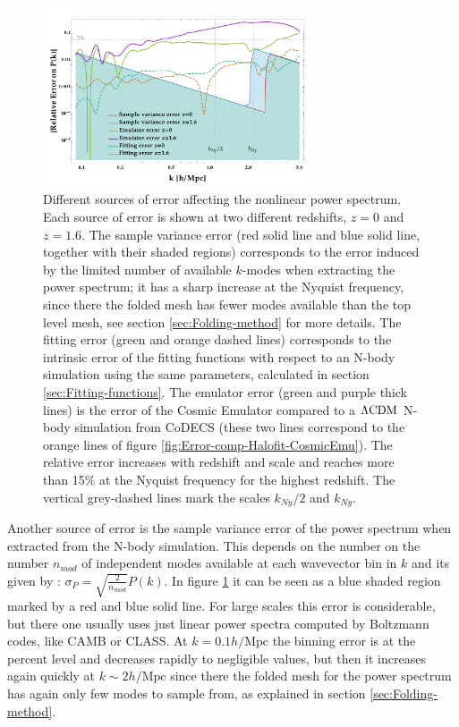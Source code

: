 \begin{figure}
\centering{}	
\includegraphics[width=0.7\textwidth]{Chapters/fitting-funcs/figures/allNbodyCosmicEmuFit-Errors-v8-Saveas}
\protect\caption[Sources of errors affecting the power spectrum from a CoDECS simulation.]{\label{fig:Error-sources}Different sources of error affecting the
nonlinear power spectrum. Each source of error is shown at two different
redshifts, $z=0$ and $z=1.6$. The sample variance error (red solid
line and blue solid line, together with their shaded regions) corresponds
to the error induced by the limited number of available $k$-modes
when extracting the power spectrum; it has a sharp increase at the
Nyquist frequency, since there the folded mesh has fewer modes available
than the top level mesh, see section \ref{sec:Folding-method} for
more details. The fitting error (green and orange dashed lines) corresponds
to the intrinsic error of the fitting functions with respect to an
N-body simulation using the same parameters, calculated in section
\ref{sec:Fitting-functions}. The emulator error (green and purple
thick lines) is the error of the Cosmic Emulator compared to a $\protect\Lambda\mathrm{CDM}$
N-body simulation from CoDECS (these two lines correspond to the orange
lines of figure \ref{fig:Error-comp-Halofit-CosmicEmu}). The relative
error increases with redshift and scale and reaches more than 15\%
at the Nyquist frequency for the highest redshift. The vertical grey-dashed
lines mark the scales $k_{Ny}/2$ and $k_{Ny}$. }
\end{figure}


Another source of error is the sample variance error of the power
spectrum when extracted from the N-body simulation. This depends on
the number on the number $n_{mod}$ of independent modes available
at each wavevector bin in $k$ and its given by \cite{feldman_power_1994}:
$\sigma_{P}=\sqrt{\frac{2}{n_{mod}}}P(k)$. In figure \ref{fig:Error-sources}
it can be seen as a blue shaded region marked by a red and blue solid
line. For large scales this error is considerable, but there one usually
uses just linear power spectra computed by Boltzmann codes, like CAMB
or CLASS. At $k=0.1h/\mbox{Mpc}$ the binning error is at the percent
level and decreases rapidly to negligible values, but then it increases
again quickly at $k\sim2h/\mbox{Mpc}$ since there the folded mesh
for the power spectrum has again only few modes to sample from, as
explained in section \ref{sec:Folding-method}.

